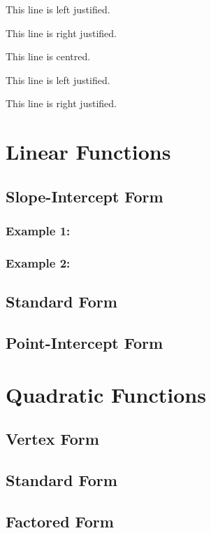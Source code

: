 \documentclass[11pt]{article}
\begin{document}
\begin{flushleft}This line is left justified.\end{flushleft}

\begin{flushright}This line is right justified.\end{flushright}

\tiny
This line is centred.

This line is left justified.

This line is right justified.

\section{Linear Functions}
	\subsection{Slope-Intercept Form}
		\subsubsection{Example 1:}
		
		\subsubsection{Example 2:}
	
	\subsection{Standard Form}
	
	\subsection{Point-Intercept Form}

\section{Quadratic Functions}
	\subsection{Vertex Form}
	
	\subsection{Standard Form}
	
	\subsection{Factored Form}
\end{document}
